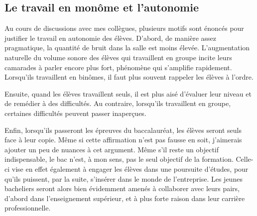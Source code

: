 \documentclass[pdftex,a4paper,12pt]{article}
\begin{document}

	\subsection{Le travail en monôme et l'autonomie}

	Au cours de discussions avec mes collègues, plusieurs motifs sont énoncés pour justifier le travail en autonomie des élèves.
	D'abord, de manière assez pragmatique, la quantité de bruit dans la salle est moins élevée. 
	L'augmentation naturelle du volume sonore des élèves qui travaillent en groupe incite leurs camarades à parler encore plus fort, phénomène qui s'amplifie rapidement. 
	Lorsqu'ils travaillent en binômes, il faut plus souvent rappeler les élèves à l'ordre.

	Ensuite, quand les élèves travaillent seuls, il est plus aisé d'évaluer leur niveau et de remédier à des difficultés. 
	Au contraire, lorsqu'ils travaillent en groupe, certaines difficultés peuvent passer inaperçues.

	Enfin, lorsqu'ils passeront les épreuves du baccalauréat, les élèves seront seuls face à leur copie.
	Même si cette affirmation n'est pas fausse en soit, j'aimerais ajouter un peu de nuances à cet argument.
	Même s'il reste un objectif indispensable, le bac n'est, à mon sens, pas le seul objectif de la formation.
	Celle-ci vise en effet également à engager les élèves dans une poursuite d'études, pour qu'ils puissent, par la suite, s'insérer dans le monde de l'entreprise.
	Les jeunes bacheliers seront alors bien évidemment amenés à collaborer avec leurs pairs, 
	d'abord dans l'enseignement supérieur, et à plus forte raison dans leur carrière professionnelle.\\
\end{document}
